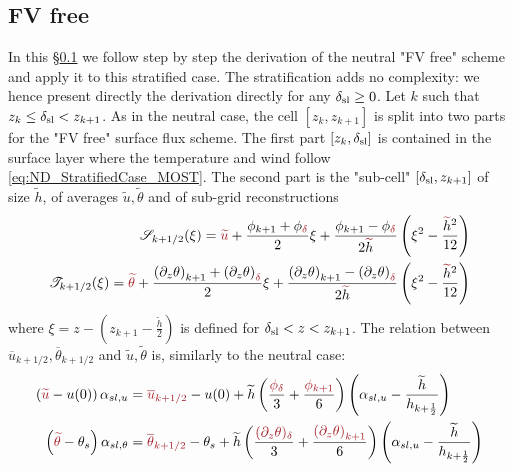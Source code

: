 \subsection{FV free}
\label{sec:ND_StratifiedCase_FVfree}
In this \S \ref{sec:ND_StratifiedCase_FVfree} we follow
step by step the derivation of the neutral "FV free" scheme and
apply it to this stratified case. The stratification adds no
complexity: we hence present directly the derivation directly for
any $\delta_{\rm sl} \geq 0$.
Let $k$ such that $z_k \leq \delta_{\rm sl} < z_{k+1}$.
As in the neutral case, the cell $[z_k, z_{k+1}]$ is split
into two parts for the "FV free" surface flux scheme.
The first part $[z_k,\delta_{\rm sl}]$ is contained
in the surface layer where the temperature and wind
follow \eqref{eq:ND_StratifiedCase_MOST}.
The second part is the
"sub-cell" $[\delta_{\rm sl}, z_{k+1}]$ of size $\widetilde{h}$, of
averages $\widetilde{u}, \widetilde{\theta}$
and of sub-grid reconstructions
\begin{equation}
\begin{aligned}
	{\cal S}_{k+1/2}(\xi) = \emphase{\widetilde{u}} +
	\frac{\phi_{k+1} + \phi_\emphase{\delta}}{2} \xi
	+ \frac{\phi_{k+1} - \phi_\emphase{\delta}}{2\emphase{\widetilde{\color{black} h}}}
	\left(\xi^2 - \frac{\emphase{\widetilde{\color{black} h}}^2}{12}\right) \\
	{\cal T}_{k+1/2}(\xi) = \emphase{\widetilde{\theta}} +
	\frac{{(\partial_z \theta)}_{k+1} + 
		{(\partial_z \theta)}_\emphase{\delta}}{2} \xi
+ \frac{{(\partial_z \theta)}_{k+1} - {(\partial_z \theta)}_\emphase{\delta}}
	{2\emphase{\widetilde{\color{black} h}}}
	\left(\xi^2 - \frac{\emphase{\widetilde{\color{black} h}}^2}{12}\right)
\end{aligned}
\end{equation}
where $\xi = z - (z_{k+1} - \frac{\widetilde{h}}{2})$ is defined
for $\delta_{\rm sl} < z < z_{k+1}$.
The relation between
$\overline{u}_{k+1/2}, \overline{\theta}_{k+1/2}$ and
$\widetilde{u},\widetilde{\theta}$ is, similarly to the neutral case:
\begin{equation}
\begin{aligned}
\label{eq:ND_StratifiedCase_relation_tilde_bar}
	\left(\emphase{\widetilde{u}} - u(0)\right)\alpha_{sl, u}
	&= \emphase{\overline{u}_{k+1/2}} - u(0) + \widetilde{h}
	\left(\frac{\emphase{\phi_\delta}}{3} +
	\frac{\emphase{\phi_{k+1}}}{6}\right)
	\left(\alpha_{sl, u} -
	\frac{\widetilde{h}}{h_{k+\frac{1}{2}}}
	\right)\\
	\left(\emphase{\widetilde{\theta}} - \theta_s\right)
	\alpha_{sl, \theta}
	&= \emphase{\overline{\theta}_{k+1/2}} - \theta_s +
	\widetilde{h}\left(
		\frac{\emphase{(\partial_z \theta)_\delta}}{3} +
		\frac{\emphase{{(\partial_z \theta)}_{k+1}}}{6}
	\right)\left(\alpha_{sl, u} -
	\frac{\widetilde{h}}{h_{k+\frac{1}{2}}}
	\right)
\end{aligned}
\end{equation}
